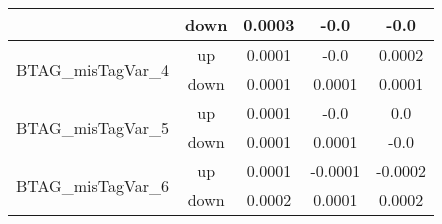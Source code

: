 \begin{table}[h!]
\begin{tabular}{lcccc}
                                       & down &     0.0003     &     -0.0     &     -0.0       \\ \hline
\multirow{2}{*}{BTAG\_misTagVar\_4}      & up   &     0.0001     &     -0.0     &     0.0002      \\
                                       & down &     0.0001     &     0.0001     &     0.0001       \\ \hline
\multirow{2}{*}{BTAG\_misTagVar\_5}      & up   &     0.0001     &     -0.0     &     0.0      \\
                                       & down &     0.0001     &     0.0001     &     -0.0       \\ \hline
\multirow{2}{*}{BTAG\_misTagVar\_6}      & up   &     0.0001     &     -0.0001     &     -0.0002      \\
                                       & down &     0.0002     &     0.0001     &     0.0002       \\ \hline


\end{tabular}
\end{table}


